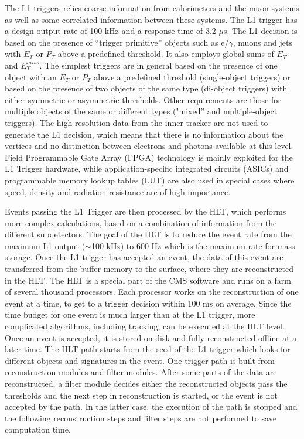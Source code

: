 The L1 triggers relies coarse information from calorimeters and the muon systems as well as some correlated information between these systems. The L1 trigger has a design output rate of 100 kHz and a response time of 3.2 $\mu$s. The L1 decision is based on the presence of ``trigger primitive'' objects such as e/$\gamma$, muons and jets with $E_{T}$ or $P_{T}$ above a predefined threshold. It also employs global sums of $E_{T}$ and $E_{T}^{miss}$. The simplest triggers are in general based on the presence of one object with an $E_{T}$ or $P_{T}$ above a predefined threshold (single-object triggers) or based on the presence of two objects of the same type (di-object triggers) with either symmetric or asymmetric thresholds. Other requirements are those for multiple objects of the same or different types ("mixed'' and multiple-object triggers). The high resolution data from the inner tracker are not used to generate the L1 decision, which means that there is no information about the vertices and no distinction between electrons and photons available at this level.
Field Programmable Gate Array (FPGA) technology is mainly exploited for the L1 Trigger hardware, while application-specific integrated circuits (ASICs) and programmable memory lookup tables (LUT) are also used in special cases where speed, density and radiation resistance are of high importance.

Events passing the L1 Trigger are then processed by the HLT, which performs more complex calculations, based on a combination of information from the different subdetectors.
The goal of the HLT is to reduce the event rate from the maximum L1 output ($\sim$100 kHz) to 600 Hz which is the maximum rate for mass storage. Once the L1 trigger has accepted
an event, the data of this event are transferred from the buffer memory to the surface, where they are reconstructed in the HLT. The HLT is a special part of the CMS software
and runs on a farm of several thousand processors. Each processor works on the reconstruction of one event at a time, to get to a trigger decision within 100 ms on average. Since the time budget for one event is much larger than at the L1 trigger, more complicated algorithms, including tracking, can be executed at the HLT level. Once an event is accepted, it is stored on disk and fully reconstructed offline at a later time. The HLT path starts from the seed of the L1 trigger which looks for different objects and signatures in the event. One trigger path is built from reconstruction modules and filter modules. After some parts of the data are reconstructed, a filter module decides either the reconstructed objects pass the thresholds and the next step in reconstruction is started, or the event is not accepted by the path. In the latter case, the execution of the path is stopped and the following reconstruction steps and filter steps are not performed to save computation time.

